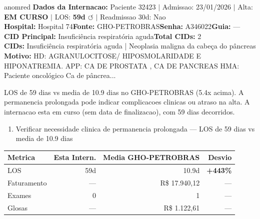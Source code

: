\documentclass[a4paper,10pt]{article}
\begin{document}
\begin{anomalycard}[Internacao 163033 | GHO-PETROBRAS | CRITICO (z=5.06)]{anomred}
\textbf{Dados da Internacao:} Paciente 32423 $\mid$ Admissao: 23/01/2026 $\mid$ Alta: \textcolor{anomorange}{\textbf{EM CURSO}} $\mid$ LOS: \textbf{59d \textcolor{anomorange}{$\circlearrowleft$}} $\mid$ Readmissao 30d: Nao\\
\textbf{Hospital:} Hospital 74\quad\textbf{Fonte:} GHO-PETROBRAS\quad\textbf{Senha:} A346022\quad\textbf{Guia:} ---\\
\textbf{CID Principal:} {\small Insuficiência respiratória aguda}\quad\textbf{Total CIDs:} 2\\

\textbf{CIDs:} {\scriptsize Insuficiência respiratória aguda | Neoplasia maligna da cabeça do pâncreas}\\

\textbf{Motivo:} {\scriptsize HD: AGRANULOCITOSE/ HIPOSMOLARIDADE E HIPONATREMIA.  APP: CA DE PROSTATA , CA DE PANCREAS HMA: Paciente oncológico Ca de pâncrea...}\\

\vspace{2pt}\begin{tcolorbox}[colback=severityred!20,colframe=anomred,title={\textbf{Interpretacao de Negocio}},fonttitle=\bfseries\small,left=4pt,right=4pt,top=3pt,bottom=3pt]
{\small LOS de 59 dias vs media de 10.9 dias no GHO-PETROBRAS (5.4x acima). A permanencia prolongada pode indicar complicacoes clinicas ou atraso na alta. A internacao esta em curso (sem data de finalizacao), com 59 dias decorridos.}
\end{tcolorbox}
\begin{tcolorbox}[colback=severityyellow!30,colframe=anomorange,title={\textbf{Recomendacoes Especificas}},fonttitle=\bfseries\small,left=4pt,right=4pt,top=3pt,bottom=3pt]
\begin{enumerate}[nosep,leftmargin=16pt]
\item {\small Verificar necessidade clinica de permanencia prolongada --- LOS de 59 dias vs media de 10.9 dias}
\end{enumerate}
\end{tcolorbox}
\begin{center}\begin{tabular}{l r r r}\toprule\textbf{Metrica} & \textbf{Esta Intern.} & \textbf{Media GHO-PETROBRAS} & \textbf{Desvio} \\\midrule
LOS & 59d & 10.9d & \textcolor{anomred}{\textbf{+443\%}} \\
Faturamento & --- & R\$ 17.940,12 & --- \\
Exames & 0 & 1 & --- \\
Glosas & --- & R\$ 1.122,61 & --- \\
\bottomrule\end{tabular}\end{center}


\end{anomalycard}
\end{document}
